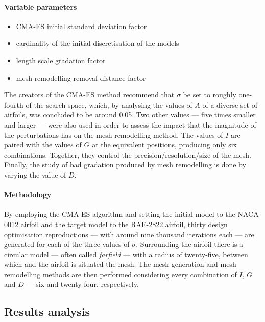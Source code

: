 \paragraph{Variable parameters}
\begin{itemize}
\item {} CMA-ES initial standard deviation factor
\item {} cardinality of the initial discretisation of the models
\item {} length scale gradation factor
\item {} mesh remodelling removal distance factor
\end{itemize}
The creators of the CMA-ES method recommend that $\sigma$ be set to roughly one-fourth of the search space, which, by analysing the values of $A$ of a diverse set of airfoils, was concluded to be around 0.05. Two other values --- five times smaller and larger --- were also used in order to assess the impact that the magnitude of the perturbations has on the mesh remodelling method. The values of $I$ are paired with the values of $G$ at the equivalent positions, producing only six combinations. Together, they control the precision/resolution/size of the mesh. Finally, the study of bad gradation produced by mesh remodelling is done by varying the value of $D$.

\paragraph{Methodology} By employing the CMA-ES algorithm and setting the initial model to the NACA-0012 airfoil and the target model to the RAE-2822 airfoil, thirty design optimisation reproductions --- with around nine thousand iterations each --- are generated for each of the three values of $\sigma$. Surrounding the airfoil there is a circular model --- often called \textit{farfield} --- with a radius of twenty-five, between which and the airfoil is situated the mesh. The mesh generation and mesh remodelling methods are then performed considering every combination of $I$, $G$ and $D$ --- six and twenty-four, respectively.

\subsection{Results analysis}

